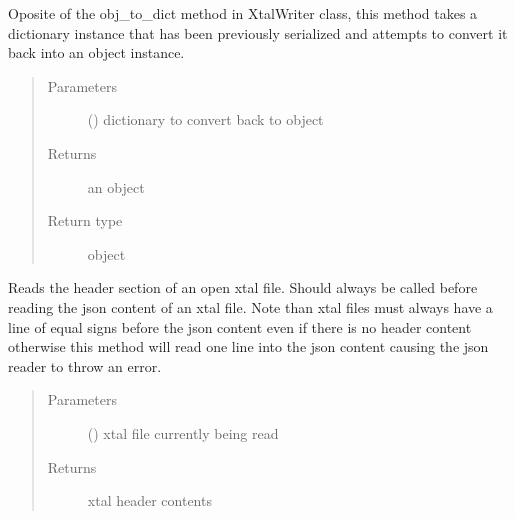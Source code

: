 \documentclass[letterpaper,10pt,english]{sphinxmanual}
\begin{document}
\begin{fulllineitems}
\begin{fulllineitems}
\label{\detokenize{polo.utils:polo.utils.io_utils.RunDeserializer.dict_to_obj}}
Oposite of the obj\_to\_dict method in XtalWriter class, this method
takes a dictionary instance that has been previously serialized and
attempts to convert it back into an object instance.
\begin{quote}\begin{description}
\item[{Parameters}] \leavevmode
{} () \textendash{} dictionary to convert back to object

\item[{Returns}] \leavevmode
an object

\item[{Return type}] \leavevmode
object

\end{description}\end{quote}

\end{fulllineitems}


\begin{fulllineitems}
\label{\detokenize{polo.utils:polo.utils.io_utils.RunDeserializer.xtal_header_reader}}
Reads the header section of an open xtal file. Should always be
called before reading the json content of an xtal file. Note than
xtal files must always have a line of equal signs before the json
content even if there is no header content otherwise this method will
read one line into the json content causing the json reader to
throw an error.
\begin{quote}\begin{description}
\item[{Parameters}] \leavevmode
{} () \textendash{} xtal file currently being read

\item[{Returns}] \leavevmode
xtal header contents


\end{description}
\end{quote}
\end{fulllineitems}
\end{fulllineitems}
\end{document}
